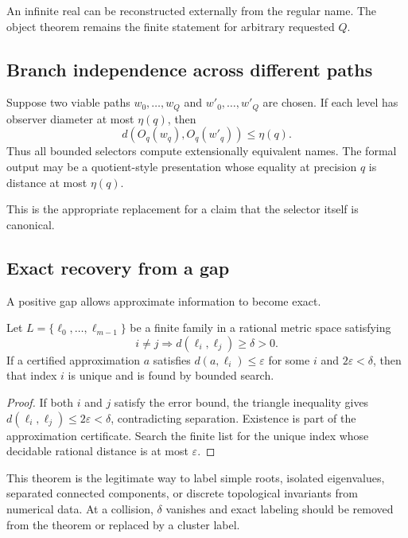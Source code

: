 An infinite real can be reconstructed externally from the regular name.  The
object theorem remains the finite statement for arbitrary requested \(Q\).

\subsection{Branch independence across different paths}

Suppose two viable paths \(w_0,\ldots,w_Q\) and
\(w'_0,\ldots,w'_Q\) are chosen.  If each level has observer diameter at most
\(\eta(q)\), then
\[
     d(O_q(w_q),O_q(w'_q))\le\eta(q).
\]
Thus all bounded selectors compute extensionally equivalent names.  The formal
output may be a quotient-style presentation whose equality at precision \(q\)
is distance at most \(\eta(q)\).

This is the appropriate replacement for a claim that the selector itself is
canonical.

\subsection{Exact recovery from a gap}

A positive gap allows approximate information to become exact.

\begin{theorem}\label{thm:gap}
Let \(L=\{\ell_0,\ldots,\ell_{m-1}\}\) be a finite family in a rational metric
space satisfying
\[
      i\ne j\Longrightarrow d(\ell_i,\ell_j)\ge\delta>0.
\]
If a certified approximation \(a\) satisfies
\(d(a,\ell_i)\le\varepsilon\) for some \(i\) and
\(2\varepsilon<\delta\), then that index \(i\) is unique and is found by
bounded search.
\end{theorem}

\begin{proof}
If both \(i\) and \(j\) satisfy the error bound, the triangle inequality gives
\(d(\ell_i,\ell_j)\le2\varepsilon<\delta\), contradicting separation.
Existence is part of the approximation certificate.  Search the finite list for
the unique index whose decidable rational distance is at most \(\varepsilon\).
\end{proof}

This theorem is the legitimate way to label simple roots, isolated eigenvalues,
separated connected components, or discrete topological invariants from
numerical data.  At a collision, \(\delta\) vanishes and exact labeling should
be removed from the theorem or replaced by a cluster label.

